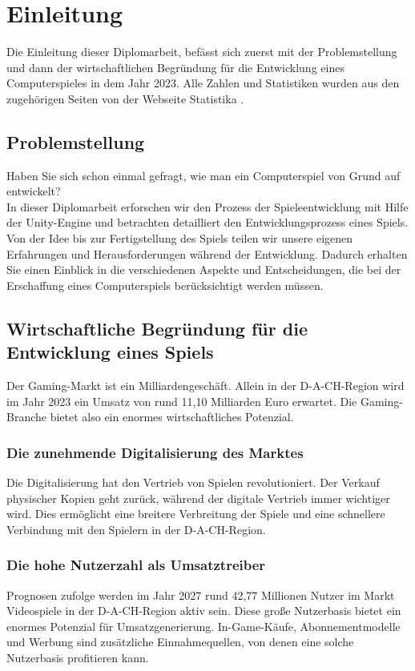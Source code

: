 \chapter{Einleitung}

Die Einleitung dieser Diplomarbeit, befässt sich zuerst mit der Problemstellung und dann der wirtschaftlichen Begründung für die Entwicklung eines Computerspieles in dem Jahr 2023. Alle Zahlen und Statistiken wurden aus den zugehörigen Seiten von der Webseite Statistika \cite{statistika}.

\section{Problemstellung}
Haben Sie sich schon einmal gefragt, wie man ein Computerspiel von Grund auf entwickelt?
\\ In dieser Diplomarbeit erforschen wir den Prozess der Spieleentwicklung mit Hilfe der Unity-Engine und betrachten detailliert den Entwicklungsprozess eines Spiels. Von der Idee bis zur Fertigstellung des Spiels teilen wir unsere eigenen Erfahrungen und Herausforderungen während der Entwicklung. Dadurch erhalten Sie einen Einblick in die verschiedenen Aspekte und Entscheidungen, die bei der Erschaffung eines Computerspiels berücksichtigt werden müssen.

\pagebreak

\section{Wirtschaftliche Begründung für die Entwicklung eines Spiels}
Der Gaming-Markt ist ein Milliardengeschäft. Allein in der D-A-CH-Region wird im Jahr 2023 ein Umsatz von rund 11,10 Milliarden Euro erwartet. Die Gaming-Branche bietet also ein enormes wirtschaftliches Potenzial.

\subsection{Die zunehmende Digitalisierung des Marktes}
Die Digitalisierung hat den Vertrieb von Spielen revolutioniert. Der Verkauf physischer Kopien geht zurück, während der digitale Vertrieb immer wichtiger wird. Dies ermöglicht eine breitere Verbreitung der Spiele und eine schnellere Verbindung mit den Spielern in der D-A-CH-Region.

\subsection{Die hohe Nutzerzahl als Umsatztreiber}
Prognosen zufolge werden im Jahr 2027 rund 42,77 Millionen Nutzer im Markt Videospiele in der D-A-CH-Region aktiv sein. Diese große Nutzerbasis bietet ein enormes Potenzial für Umsatzgenerierung. In-Game-Käufe, Abonnementmodelle und Werbung sind zusätzliche Einnahmequellen, von denen eine solche Nutzerbasis profitieren kann.

